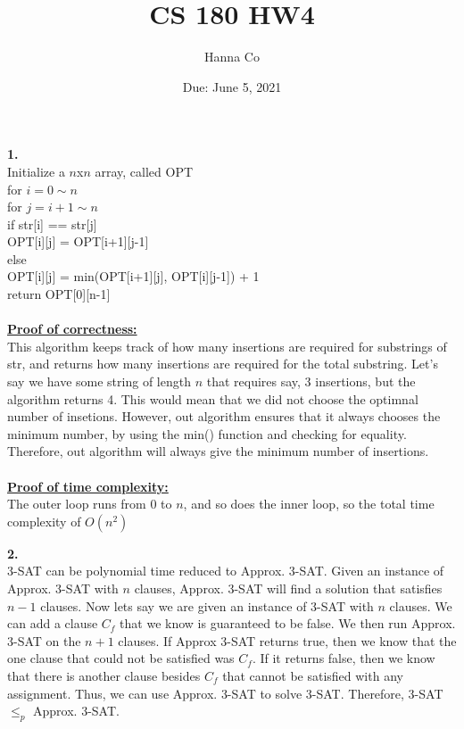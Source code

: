 \documentclass[10pt, letterpaper]{report}
\title{CS 180 HW4}
\author{Hanna Co}
\date{Due: June 5, 2021}
\newcommand\tab[1][1cm]{\hspace*{#1}}
\begin{document}
\maketitle
\noindent \large{\textbf{1.} } \\
Initialize a $n$x$n$ array, called OPT\\
for \(i = 0 \sim n\) \\
\tab for \(j = i+1 \sim n\)\\
\tab\tab if str[i] == str[j]\\
\tab\tab\tab OPT[i][j] = OPT[i+1][j-1]\\
\tab\tab else\\
\tab\tab\tab OPT[i][j] = min(OPT[i+1][j], OPT[i][j-1]) + 1\\
return OPT[0][n-1]\\
\\
\textbf{\underline{Proof of correctness:}}\\
This algorithm keeps track of how many insertions are required for substrings of str, and returns how many insertions are required for the total substring. Let's say we have some string of length $n$ that requires say, 3 insertions, but the algorithm returns 4. This would mean that we did not choose the optimnal number of insetions. However, out algorithm ensures that it always chooses the minimum number, by using the min() function and checking for equality. Therefore, out algorithm will always give the minimum number of insertions.\\
\\
\textbf{\underline{Proof of time complexity:}}\\
The outer loop runs from 0 to $n$, and so does the inner loop, so the total time complexity of \(O(n^2)\)

\newpage
\noindent \large{\textbf{2.} } \\
3-SAT can be polynomial time reduced to Approx. 3-SAT. Given an instance of Approx. 3-SAT with $n$ clauses, Approx. 3-SAT will find a solution that satisfies $n-1$ clauses. Now lets say we are given an instance of 3-SAT with $n$ clauses. We can add a clause $C_f$ that we know is guaranteed to be false. We then run Approx. 3-SAT on the $n+1$ clauses. If Approx 3-SAT returns true, then we know that the one clause that could not be satisfied was $C_f$. If it returns false, then we know that there is another clause besides $C_f$ that cannot be satisfied with any assignment. Thus, we can use Approx. 3-SAT to solve 3-SAT.  Therefore, 3-SAT $\leq_p$ Approx. 3-SAT.
\end{document}
